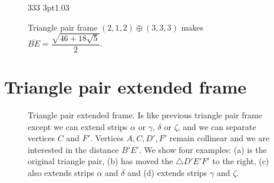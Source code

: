 \documentclass[11pt]{article}
\begin{document}
\begin{figure}[H]
\centering
\begin{center}
 {3}{3}{3} {3pt}{1.0}{3} %
\end{center}
\caption{Triangle pair frame $(2,1,2) \oplus (3,3,3)$ makes $\overline{BE} = \dfrac{\sqrt{46+18\sqrt{5}}}{2}$.}
\label{fig:tripair212333}
\end{figure}

\section{Triangle pair extended frame}

\begin{figure}[H]
 \centering
 \caption{Triangle pair extended frame. Is like previous triangle pair frame except
 we can extend strips $\alpha$ or $\gamma$, $\delta$ or $\zeta$, and we can separate vertices $C$ and $F'$.
 Vertices $A,C,D',F'$ remain collinear and we are interested in the distance $\overline{B'E'}$.
 We show four examples: (a) is the original triangle pair,
 (b) has moved the $\triangle{D'E'F'}$ to the right,
 (c) also extends strips $\alpha$ and $\delta$ and (d) extends strips $\gamma$ and $\zeta$.
 }
 \label{fig:tripairext}
\end{figure}
\end{document}
